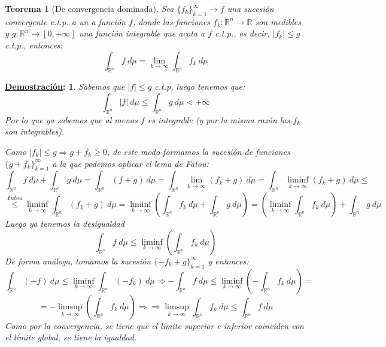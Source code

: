 \documentclass[10pt,a4paper,openright]{book}
\theoremstyle{break}
\newtheorem*{theo}{Teorema}
\newtheorem*{demo}{\underline{Demostración}:}
\newcommand{\dif}[1]{\ d#1}
\begin{document}
\begin{theo}[De convergencia dominada]
Sea $\{f_k\}_{k=1}^{\infty}\rightarrow f$ una sucesión convergente c.t.p. a un a función $f$, donde las funciones $f_k: \mathbb{R}^n \rightarrow \mathbb{R}$ son medibles y $g: \mathbb{R}^n \rightarrow \left[0, +\infty\right]$ una función integrable que acota a $f$ c.t.p., es decir, $\vert f_k \vert \le g$ c.t.p., entonces:
$$\int_{\mathbb{R}^n} f \dif{\mu} = \lim_{k \rightarrow \infty} \int_{\mathbb{R}^n} f_k \dif{\mu}$$
\end{theo}
\begin{demo}
Sabemos que $\vert f \vert \le g$ c.t.p, luego tenemos que:
$$\int_{\mathbb{R}^n} \vert f \vert \dif{\mu} \le \int_{\mathbb{R}^n} g \dif{\mu} < +\infty$$
Por lo que ya sabemos que al menos $f$ es integrable (y por la misma razón las $f_k$ son integrables).

Como $\vert f_k \vert \le g \Rightarrow g + f_k \ge 0$, de este modo formamos la sucesión de funciones $\{g + f_k\}_{k=1}^{\infty}$ a la que podemos aplicar el lema de Fatou: 
$$\int_{\mathbb{R}^n} f \dif{\mu} + \int_{\mathbb{R}^n} g \dif{\mu} = \int_{\mathbb{R}^n} \left(f + g\right) \dif{\mu} = \int_{\mathbb{R}^n} \lim_{k \rightarrow \infty} \left(f_k + g\right) \dif{\mu} =\int_{\mathbb{R}^n} \liminf_{k \rightarrow \infty} \left(f_k + g\right)  \dif{\mu} \leq$$
$$ \stackrel{Fatou}{\le} \liminf_{k \rightarrow \infty}\int_{\mathbb{R}^n} \left(f_k + g\right) \dif{\mu} = \liminf_{k \rightarrow \infty} \left( \int_{\mathbb{R}^n} f_k \dif{\mu} + \int_{\mathbb{R}^n} g \dif{\mu} \right) = \left(\liminf_{k \rightarrow \infty} \int_{\mathbb{R}^n} f_k \dif{\mu}  \right) + \int_{\mathbb{R}^n} g \dif{\mu}$$
Luego ya tenemos la desigualdad
$$\int_{\mathbb{R}^n} f \dif{\mu} \le \liminf_{k \rightarrow \infty}\left( \int_{\mathbb{R}^n} f_k \dif{\mu}\right)$$
De forma análoga, tomamos la sucesión $\{-f_k + g\}_{k=1}^{\infty}$ y entonces:
$$\int_{\mathbb{R}^n} \left(-f\right) \dif{\mu} \le \liminf_{k \rightarrow \infty} \int_{\mathbb{R}^n} \left(-f_k\right) \dif{\mu} \Rightarrow - \int_{\mathbb{R}^n} f \dif{\mu} \le \liminf_{k \rightarrow \infty} \left(-\int_{\mathbb{R}^n} f_k \dif{\mu} \right) =$$
$$= -\limsup_{k \rightarrow \infty} \left(\int_{\mathbb{R}^n} f_k \dif{\mu} \right) \Rightarrow \Rightarrow \limsup_{k \rightarrow \infty} \int_{\mathbb{R}^n} f_k \dif{\mu} \le \int_{\mathbb{R}^n} f \dif{\mu} $$
Como por la convergencia, se tiene que el límite superior e inferior coinciden con el límite global, se tiene la igualdad.
\end{demo}
\end{document}
